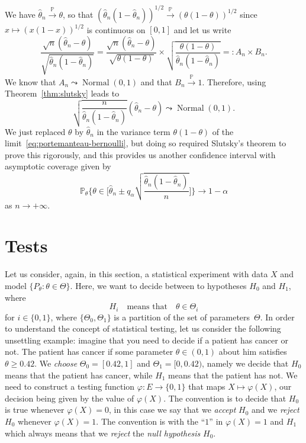 \documentclass[
	fontsize=11pt, %
	twoside=false, %
	numbers=noenddot, %
]{kaobook}
\DeclareMathOperator{\nor}{Normal}
\renewcommand{\P}{\mathbb P}
\newcommand{\wh}{\widehat}
\newcommand{\goes}{\rightarrow}
\newcommand{\gopro}{\overset{\P}{\rightarrow}}
\newcommand{\gosto}{\leadsto}
\begin{document}
We have $\wh \theta_n \gopro \theta$, so that $(\wh \theta_n (1 - \wh \theta_n))^{1/2} \gopro (\theta (1 -  \theta))^{1/2}$ since $x \mapsto (x(1-x))^{1/2}$ is continuous on $[0, 1]$ and let us write
\begin{equation*}
	\frac{\sqrt n (\wh \theta_n - \theta)}{\sqrt{\wh \theta_n (1 - \wh \theta_n)}} 
	= \frac{\sqrt n (\wh \theta_n - \theta)}{\sqrt{ \theta (1 -  \theta)}} \times 
	\sqrt{\frac{ \theta (1 -  \theta)}{\wh \theta_n (1 - \wh \theta_n)}} =: A_n \times B_n.
\end{equation*}
We know that $A_n \gosto \nor(0, 1)$ and that $B_n \gopro 1$.
Therefore, using Theorem~\ref{thm:slutsky} leads%
%
to
\begin{equation*}
	\sqrt{\frac{n}{\wh \theta_n (1 - \wh \theta_n)}} (\wh \theta_n - \theta) \gosto \nor(0, 1).
\end{equation*}
We just replaced $\theta$ by $\wh \theta_n$ in the variance term $\theta(1 - \theta)$ of the limit~\eqref{eq:portemanteau-bernoulli}, but doing so required Slutsky's theorem to prove this rigorously, and this provides us another confidence interval with asymptotic coverage given by
\begin{equation*}
	\P_\theta \bigg\{ \theta \in \Big[ \wh \theta_n \pm q_\alpha \sqrt{\frac{\wh \theta_n (1 - \wh \theta_n)}{n}} \Big] \bigg\} \goes 1 - \alpha
\end{equation*}
as $n \goes +\infty$.%
%


\section{Tests} %
\label{sec:tests}

Let us consider, again, in this section, a statistical experiment with data $X$ and model $\{ P_\theta : \theta \in \Theta \}$.
Here, we want to decide between to hypotheses $H_0$ and $H_1$, where
\begin{equation*}
	H_i \quad \text{means that} \quad \theta \in \Theta_i
\end{equation*}
for $i \in \{ 0, 1 \}$, where $\{ \Theta_0, \Theta_1 \}$ is a partition of the set of parameters~$\Theta$.
In order to understand the concept of statistical testing, let us consider the following unsettling example: imagine that you need to decide if a patient has cancer or not.
The patient has cancer if some parameter $\theta \in (0, 1)$ about him satisfies
$\theta \geq 0.42$.
We \emph{choose} $\Theta_0 = [0.42, 1]$ and $\Theta_1 = [0, 0.42)$, namely we decide that $H_0$ means that the patient has cancer, while $H_1$ means that the patient has not.
We need to construct a testing function $\varphi : E \goes \{ 0, 1 \}$ that maps $X \mapsto \varphi(X)$, our decision being given by the value of $\varphi(X)$. 
The convention is to decide that $H_0$ is true whenever $\varphi(X) = 0$, in this case we say that we \emph{accept} $H_0$ and we \emph{reject} $H_0$ whenever $\varphi(X) = 1$.
The convention is with the ``$1$'' in $\varphi(X) = 1$ and $H_1$ which always means that we \emph{reject} the \emph{null hypothesis} $H_0$.
\end{document}
